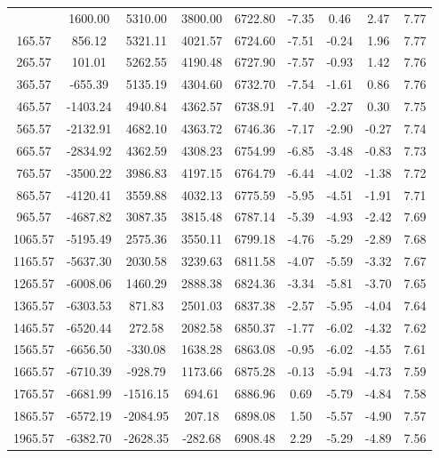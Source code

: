 \begin{center}
\begin{longtable}{|c|c|c|c|c|c|c|c|c|}
    \hline
    \endlastfoot
    65.57 & 1600.00 & 5310.00 & 3800.00  & 6722.80 & -7.35 &  0.46 &  2.47 & 7.77 \\ 
    165.57 & 856.12 & 5321.11 & 4021.57  & 6724.60 & -7.51 &  -0.24 &  1.96 & 7.77 \\ 
    265.57 & 101.01 & 5262.55 & 4190.48  & 6727.90 & -7.57 &  -0.93 &  1.42 & 7.76 \\ 
    365.57 & -655.39 & 5135.19 & 4304.60  & 6732.70 & -7.54 &  -1.61 &  0.86 & 7.76 \\ 
    465.57 & -1403.24 & 4940.84 & 4362.57  & 6738.91 & -7.40 &  -2.27 &  0.30 & 7.75 \\ 
    565.57 & -2132.91 & 4682.10 & 4363.72  & 6746.36 & -7.17 &  -2.90 &  -0.27 & 7.74 \\ 
    665.57 & -2834.92 & 4362.59 & 4308.23  & 6754.99 & -6.85 &  -3.48 &  -0.83 & 7.73 \\ 
    765.57 & -3500.22 & 3986.83 & 4197.15  & 6764.79 & -6.44 &  -4.02 &  -1.38 & 7.72 \\ 
    865.57 & -4120.41 & 3559.88 & 4032.13  & 6775.59 & -5.95 &  -4.51 &  -1.91 & 7.71 \\ 
    965.57 & -4687.82 & 3087.35 & 3815.48  & 6787.14 & -5.39 &  -4.93 &  -2.42 & 7.69 \\ 
    1065.57 & -5195.49 & 2575.36 & 3550.11  & 6799.18 & -4.76 &  -5.29 &  -2.89 & 7.68 \\ 
    1165.57 & -5637.30 & 2030.58 & 3239.63  & 6811.58 & -4.07 &  -5.59 &  -3.32 & 7.67 \\ 
    1265.57 & -6008.06 & 1460.29 & 2888.38  & 6824.36 & -3.34 &  -5.81 &  -3.70 & 7.65 \\ 
    1365.57 & -6303.53 & 871.83 & 2501.03  & 6837.38 & -2.57 &  -5.95 &  -4.04 & 7.64 \\ 
    1465.57 & -6520.44 & 272.58 & 2082.58  & 6850.37 & -1.77 &  -6.02 &  -4.32 & 7.62 \\ 
    1565.57 & -6656.50 & -330.08 & 1638.28  & 6863.08 & -0.95 &  -6.02 &  -4.55 & 7.61 \\ 
    1665.57 & -6710.39 & -928.79 & 1173.66  & 6875.28 & -0.13 &  -5.94 &  -4.73 & 7.59 \\ 
    1765.57 & -6681.99 & -1516.15 & 694.61  & 6886.96 & 0.69 &  -5.79 &  -4.84 & 7.58 \\ 
    1865.57 & -6572.19 & -2084.95 & 207.18  & 6898.08 & 1.50 &  -5.57 &  -4.90 & 7.57 \\ 
    1965.57 & -6382.70 & -2628.35 & -282.68  & 6908.48 & 2.29 &  -5.29 &  -4.89 & 7.56 \\ 

\end{longtable}
\end{center}
